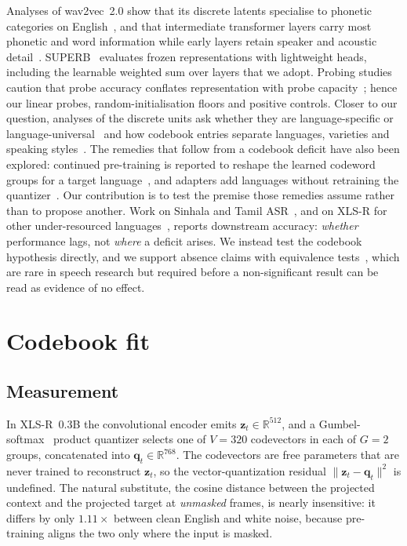 \documentclass{article}
\begin{document}
Analyses of wav2vec~2.0 show that its discrete latents specialise to phonetic categories on English~\cite{baevski2020wav2vec}, and that intermediate transformer layers carry most phonetic and word information while early layers retain speaker and acoustic detail~\cite{pasad2021layerwise,pasad2023comparative}. SUPERB~\cite{yang2021superb} evaluates frozen representations with lightweight heads, including the learnable weighted sum over layers that we adopt. Probing studies caution that probe accuracy conflates representation with probe capacity~\cite{hewitt2019control,belinkov2022probing}; hence our linear probes, random-initialisation floors and positive controls. Closer to our question, analyses of the discrete units ask whether they are language-specific or language-universal~\cite{abdullah2023discrete} and how codebook entries separate languages, varieties and speaking styles~\cite{linke2023encode}. The remedies that follow from a codebook deficit have also been explored: continued pre-training is reported to reshape the learned codeword groups for a target language~\cite{getman2024cpt}, and adapters add languages without retraining the quantizer~\cite{kessler2022adapter}. Our contribution is to test the premise those remedies assume rather than to propose another. Work on Sinhala and Tamil ASR~\cite{akhilesh2022tamil,icon2021sinhala,ilyas2026sinhala}, and on XLS-R for other under-resourced languages~\cite{nandi2021large}, reports downstream accuracy: \emph{whether} performance lags, not \emph{where} a deficit arises. We instead test the codebook hypothesis directly, and we support absence claims with equivalence tests~\cite{schuirmann1987tost,lakens2017equivalence}, which are rare in speech research but required before a non-significant result can be read as evidence of no effect.

\section{Codebook fit}
\label{sec:fit}

\subsection{Measurement}

In XLS-R~0.3B the convolutional encoder emits $\mathbf{z}_t\in\mathbb{R}^{512}$, and a Gumbel-softmax~\cite{jang2017gumbel} product quantizer selects one of $V{=}320$ codevectors in each of $G{=}2$ groups, concatenated into $\mathbf{q}_t\in\mathbb{R}^{768}$. The codevectors are free parameters that are never trained to reconstruct $\mathbf{z}_t$, so the vector-quantization residual $\|\mathbf{z}_t-\mathbf{q}_t\|^2$ is undefined. The natural substitute, the cosine distance between the projected context and the projected target at \emph{unmasked} frames, is nearly insensitive: it differs by only $1.11\times$ between clean English and white noise, because pre-training aligns the two only where the input is masked.
\end{document}
